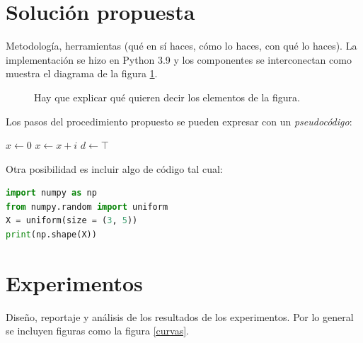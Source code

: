 \documentclass{sciposter}
\begin{document}
\begin{multicols}{2}
\section{Solución propuesta}

Metodología, herramientas (qué en sí haces, cómo lo haces, con qué lo haces).
La implementación se hizo en Python 3.9 \citep{python} y los componentes se interconectan como muestra el diagrama de la figura \ref{diag}.

\begin{figure}
\captionsetup{type=figure} %
\setcounter{figure}{0} %
\begin{center}
\end{center}
\caption{Hay que explicar qué quieren decir los elementos de la figura.}
\label{diag}
\end{figure}

Los pasos del procedimiento propuesto se pueden expresar con un {\em pseudocódigo}:

\begin{algorithmic}[1]
\State $x \leftarrow 0$
	\State $x \leftarrow x + i$
\EndFor
{}
    \State $d \leftarrow \top$
\EndIf
\end{algorithmic} 

Otra posibilidad es incluir algo de código tal cual:
\begin{lstlisting}[language=Python, caption=Procedimiento del segundo paso]
import numpy as np
from numpy.random import uniform
X = uniform(size = (3, 5))
print(np.shape(X))
\end{lstlisting}

\section{Experimentos}

Diseño, reportaje y análisis de los resultados de los experimentos. Por lo general se incluyen figuras como la figura \ref{curvas}.


\end{multicols}
\end{document}
